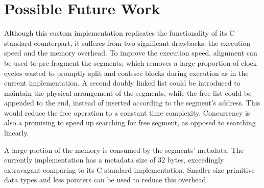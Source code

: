 \documentclass[12pt, letterpaper]{article}
\begin{document}
  \section*{Possible Future Work}
    Although this custom implementation replicates the functionality of its C standard counterpart,
    it sufferes from two significant drawbacks: the execution speed and the memory overhead.
    To improve the execution speed, alignment can be used to pre-fragment the segments,
    which removes a large proportion of clock cycles wasted to promptly split and coalesce blocks during execution as in the current implementation.
    A second doubly linked list could be introduced to maintain the physical arrangement of the segments,
    while the free list could be appended to the end, instead of inserted according to the segment's address.
    This would reduce the free operation to a constant time complexity. 
    Concurrency is also a promising to speed up searching for free segment, as opposed to searching linearly. 

    A large portion of the memory is consumed by the segments' metadata. 
    The currently implementation has a metadata size of $32$ bytes,
    exceedingly extravagant comparing to its C standard implementation. 
    Smaller size primitive data types and less pointers can be used to reduce this overhead.      
\end{document}
